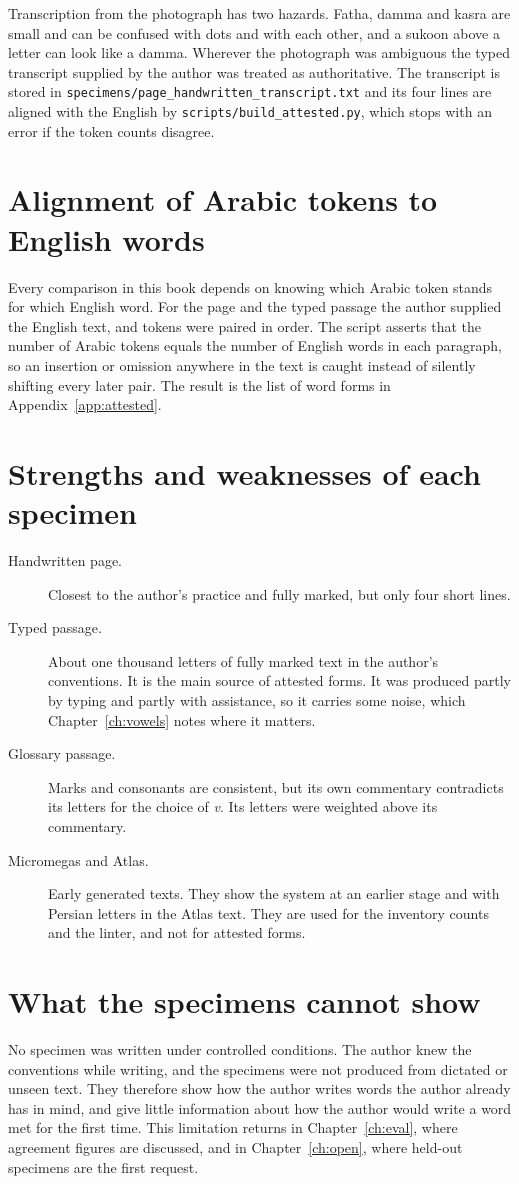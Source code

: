 Transcription from the photograph has two hazards. Fatha, damma and kasra are small and can be confused with dots and with each other, and a sukoon above a letter can look like a damma. Wherever the photograph was ambiguous the typed transcript supplied by the author was treated as authoritative. The transcript is stored in \texttt{specimens/page\_handwritten\_transcript.txt} and its four lines are aligned with the English by \texttt{scripts/build\_attested.py}, which stops with an error if the token counts disagree.

\section{Alignment of Arabic tokens to English words}
Every comparison in this book depends on knowing which Arabic token stands for which English word. For the page and the typed passage the author supplied the English text, and tokens were paired in order. The script asserts that the number of Arabic tokens equals the number of English words in each paragraph, so an insertion or omission anywhere in the text is caught instead of silently shifting every later pair. The result is the list of \NAttested{} word forms in Appendix~\ref{app:attested}.

\section{Strengths and weaknesses of each specimen}
\begin{description}
\item[Handwritten page.] Closest to the author's practice and fully marked, but only four short lines.
\item[Typed passage.] About one thousand letters of fully marked text in the author's conventions. It is the main source of attested forms. It was produced partly by typing and partly with assistance, so it carries some noise, which Chapter~\ref{ch:vowels} notes where it matters.
\item[Glossary passage.] Marks and consonants are consistent, but its own commentary contradicts its letters for the choice of \emph{v}. Its letters were weighted above its commentary.
\item[Micromegas and Atlas.] Early generated texts. They show the system at an earlier stage and with Persian letters in the Atlas text. They are used for the inventory counts and the linter, and not for attested forms.
\end{description}

\section{What the specimens cannot show}
No specimen was written under controlled conditions. The author knew the conventions while writing, and the specimens were not produced from dictated or unseen text. They therefore show how the author writes words the author already has in mind, and give little information about how the author would write a word met for the first time. This limitation returns in Chapter~\ref{ch:eval}, where agreement figures are discussed, and in Chapter~\ref{ch:open}, where held-out specimens are the first request.
